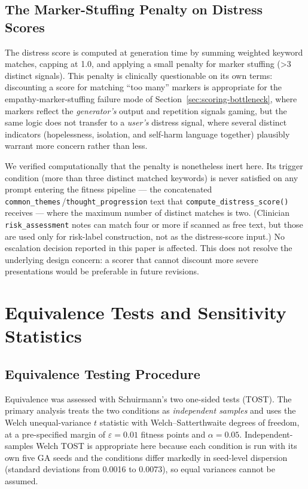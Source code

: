 \documentclass[mathematics,article,submit,xetex,moreauthors]{Definitions/mdpi}
\begin{document}
\subsection{The Marker-Stuffing Penalty on Distress Scores}
\label{app:stuffing}

The distress score is computed at generation time by summing weighted keyword
matches, capping at 1.0, and applying a small penalty for marker stuffing
(>3 distinct signals). This penalty is clinically questionable on its own
terms: discounting a score for matching ``too many'' markers is appropriate
for the empathy-marker-stuffing failure mode of
Section~\ref{sec:scoring-bottleneck}, where markers reflect the
\emph{generator's} output and repetition signals gaming, but the same logic
does not transfer to a \emph{user's} distress signal, where several distinct
indicators (hopelessness, isolation, and self-harm language together)
plausibly warrant more concern rather than less.

We verified computationally that the penalty is nonetheless inert here. Its
trigger condition (more than three distinct matched keywords) is never
satisfied on any prompt entering the fitness pipeline --- the concatenated
\texttt{common\_themes}\,/\texttt{thought\_progression} text that
\texttt{compute\_distress\_score()} receives --- where the maximum number of
distinct matches is two. (Clinician \texttt{risk\_assessment} notes can match
four or more if scanned as free text, but those are used only for risk-label
construction, not as the distress-score input.) No escalation decision
reported in this paper is affected. This does not resolve the underlying
design concern: a scorer that cannot discount more severe presentations
would be preferable in future revisions.

\section{Equivalence Tests and Sensitivity Statistics}
\label{app:equivalence}

\subsection{Equivalence Testing Procedure}
\label{app:tost-method}

Equivalence was assessed with Schuirmann's two one-sided tests (TOST). The
primary analysis treats the two conditions as \emph{independent samples} and
uses the Welch unequal-variance $t$ statistic with Welch--Satterthwaite
degrees of freedom, at a pre-specified margin of $\varepsilon=0.01$ fitness
points and $\alpha=0.05$. Independent-samples Welch TOST is appropriate here
because each condition is run with its own five GA seeds and the conditions
differ markedly in seed-level dispersion (standard deviations from 0.0016 to
0.0073), so equal variances cannot be assumed.
\end{document}
